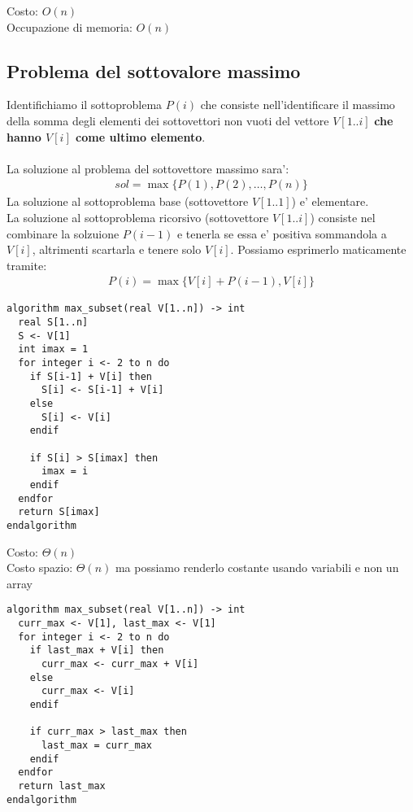\documentclass{article}
\begin{document}
Costo: $O(n)$ \\
Occupazione di memoria: $O(n)$

\subsection{Problema del sottovalore massimo}

Identifichiamo il sottoproblema $P(i)$ che consiste nell'identificare il massimo
della somma degli elementi dei sottovettori non vuoti del vettore $V[1..i]$ \textbf{
che hanno $V[i]$ come ultimo elemento}. \\ \\

La soluzione al problema del sottovettore massimo sara':
\begin{align*}
  sol = \max\{P(1), P(2), \ldots, P(n)\}
\end{align*}
La soluzione al sottoproblema base (sottovettore $V[1..1]$) e' elementare. \\
La soluzione al sottoproblema ricorsivo (sottovettore $V[1..i]$) consiste nel
combinare la solzuione $P(i-1)$ e tenerla se essa e' positiva sommandola a $V[i]$,
altrimenti scartarla e tenere solo $V[i]$. Possiamo esprimerlo maticamente tramite:
\begin{align*}
  P(i) = \max\{ V[i] + P(i-1), V[i] \}
\end{align*}

\begin{lstlisting}
algorithm max_subset(real V[1..n]) -> int
  real S[1..n]
  S <- V[1]
  int imax = 1
  for integer i <- 2 to n do
    if S[i-1] + V[i] then
      S[i] <- S[i-1] + V[i]
    else
      S[i] <- V[i]
    endif

    if S[i] > S[imax] then
      imax = i
    endif
  endfor
  return S[imax]
endalgorithm
\end{lstlisting}

Costo: $\Theta(n)$ \\
Costo spazio: $\Theta(n)$ ma possiamo renderlo costante usando variabili e non un array

\begin{lstlisting}
algorithm max_subset(real V[1..n]) -> int
  curr_max <- V[1], last_max <- V[1]
  for integer i <- 2 to n do
    if last_max + V[i] then
      curr_max <- curr_max + V[i]
    else
      curr_max <- V[i]
    endif

    if curr_max > last_max then
      last_max = curr_max
    endif
  endfor
  return last_max
endalgorithm
\end{lstlisting}
\end{document}
